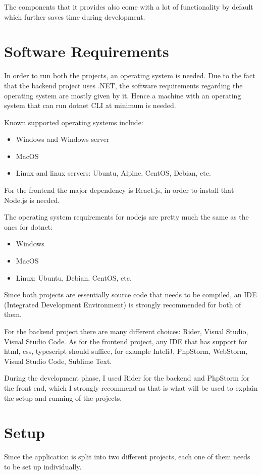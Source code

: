 The components that it provides also come with a lot of functionality by default which further saves time during development.


\section{Software Requirements}
In order to run both the projects, an operating system is needed. Due to the fact that the backend project uses .NET, the software requirements regarding the operating system are mostly given by it. Hence a machine with an operating system that can run dotnet CLI at minimum is needed. 

Known supported operating systems include\cite{dotnetSupportedOs}:
\begin{itemize}
    \item Windows and Windows server
    \item MacOS
    \item Linux and linux servers: Ubuntu, Alpine, CentOS, Debian, etc.
\end{itemize}

For the frontend the major dependency is React.js, in order to install that Node.js is needed. 

The operating system requirements for nodejs are pretty much the same as the ones for dotnet\cite{nodejsSupportedOs}:
\begin{itemize}
    \item Windows
    \item MacOS
    \item Linux: Ubuntu, Debian, CentOS, etc.
\end{itemize}

Since both projects are essentially source code that needs to be compiled, an IDE (Integrated Development Environment) is strongly recommended for both of them.

For the backend project there are many different choices: Rider, Visual Studio, Visual Studio Code. As for the frontend project, any IDE that has support for html, css, typescript should suffice, for example InteliJ, PhpStorm, WebStorm, Visual Studio Code, Sublime Text.

During the development phase, I used Rider for the backend and PhpStorm for the front end, which I strongly recommend as that is what will be used to explain the setup and running of the projects.

\section{Setup}
Since the application is split into two different projects, each one of them needs to be set up individually.

